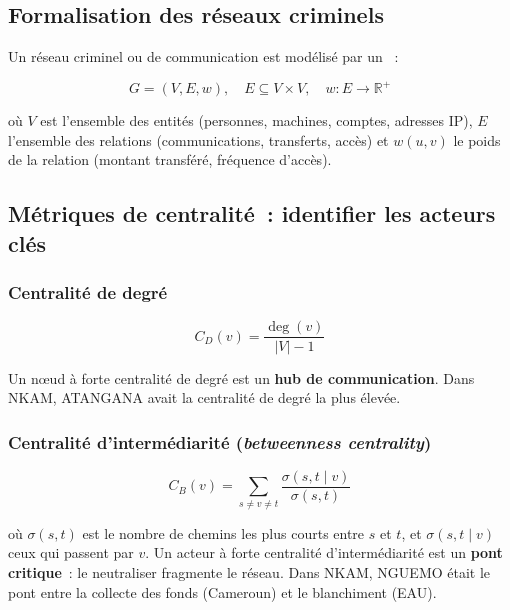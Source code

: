 \subsection{Formalisation des réseaux criminels}

Un réseau criminel ou de communication est modélisé par un
~:

\begin{equation}
G = (V, E, w), \quad
E \subseteq V \times V, \quad
w : E \to \mathbb{R}^+
\label{eq:graphe-pondere}
\end{equation}

où $V$ est l'ensemble des entités (personnes, machines, comptes, adresses IP),
$E$ l'ensemble des relations (communications, transferts, accès) et $w(u,v)$
le poids de la relation (montant transféré, fréquence d'accès).

\subsection{Métriques de centralité~: identifier les acteurs clés}

\subsubsection{Centralité de degré}

\begin{equation}
C_D(v) = \frac{\deg(v)}{|V| - 1}
\label{eq:centralite-degre}
\end{equation}

Un nœud à forte centralité de degré est un \textbf{hub de communication}.
Dans NKAM, ATANGANA avait la centralité de degré la plus élevée.

\subsubsection{Centralité d'intermédiarité (\textit{betweenness centrality})}

\begin{equation}
C_B(v) = \sum_{s \neq v \neq t}
\frac{\sigma(s, t \mid v)}{\sigma(s, t)}
\label{eq:centralite-betweenness}
\end{equation}

où $\sigma(s,t)$ est le nombre de chemins les plus courts entre $s$ et $t$,
et $\sigma(s,t \mid v)$ ceux qui passent par $v$. Un acteur à forte centralité
d'intermédiarité est un \textbf{pont critique}~: le neutraliser fragmente
le réseau. Dans NKAM, NGUEMO était le pont entre la collecte des fonds
(Cameroun) et le blanchiment (EAU).

